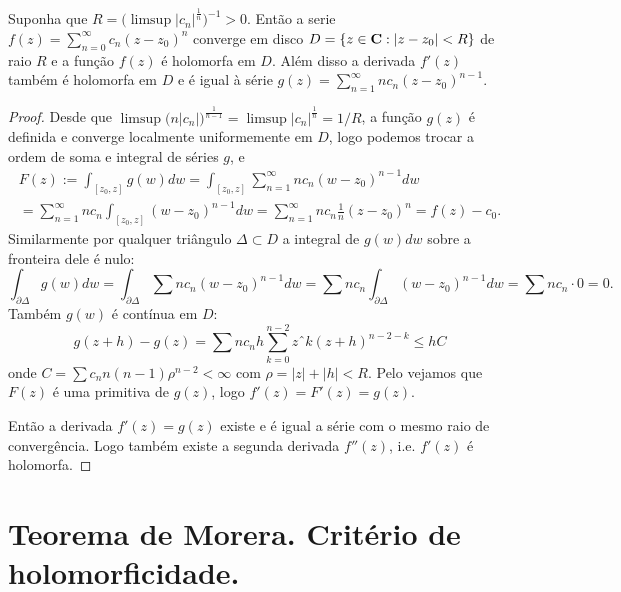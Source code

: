 \begin{teorema}
\label{t:series-derhol}
Suponha que $R = \big(\limsup |c_n|^{\frac1n}\big)^{-1} > 0$. Então a serie
$f(z) = \sum_{n=0}^\infty c_n (z-z_0)^n$ converge em disco
$D = \{z\in\mathbf{C} : |z-z_0|<R\}$ de raio $R$ e a função $f(z)$ é holomorfa em $D$.
Além disso a derivada $f'(z)$ também é holomorfa em $D$
e é igual à série $g(z) = \sum_{n=1}^\infty n c_n (z-z_0)^{n-1}$.
\end{teorema}
\begin{proof}
Desde que $\limsup \big(n|c_n|\big)^{\frac{1}{n-1}} = \limsup |c_n|^{\frac1n} = 1/R$,
a função $g(z)$ é definida e converge localmente uniformemente em $D$,
logo podemos trocar a ordem de soma e integral de séries $g$, e
\begin{multline}
F(z) := \int_{[z_0,z]} g(w) dw
= \int_{[z_0,z]} \sum_{n=1}^\infty n c_n (w-z_0)^{n-1} dw
\\
= \sum_{n=1}^\infty n c_n \int_{[z_0,z]} (w-z_0)^{n-1} dw
= \sum_{n=1}^\infty n c_n \frac1n (z-z_0)^n = f(z) - c_0.
\end{multline}
Similarmente por qualquer triângulo $\Delta \subset D$ a integral de $g(w)dw$ sobre a fronteira dele é nulo:
\[ \int_{\partial \Delta} g(w) dw = \int_{\partial \Delta} \sum n c_n (w-z_0)^{n-1} dw
= \sum n c_n \int_{\partial \Delta} (w-z_0)^{n-1} dw = \sum n c_n \cdot 0 = 0. \]
Também $g(w)$ é contínua em $D$:
\[ g(z+h) - g(z) = \sum n c_n h \sum_{k=0}^{n-2} zˆk (z+h)^{n-2-k}
\leq h C \]
onde $C = \sum c_n n (n-1) \rho^{n-2} < \infty$ com $\rho = |z|+|h|<R$.
Pelo  vejamos que $F(z)$ é uma primitiva de $g(z)$,
logo $f'(z) = F'(z) = g(z)$.

Então a derivada $f'(z) = g(z)$ existe e é igual a série com o mesmo raio de convergência.
Logo também existe a segunda derivada $f''(z)$, i.e. $f'(z)$ é holomorfa.
\end{proof}

\section{Teorema de Morera. Critério de holomorficidade.}

